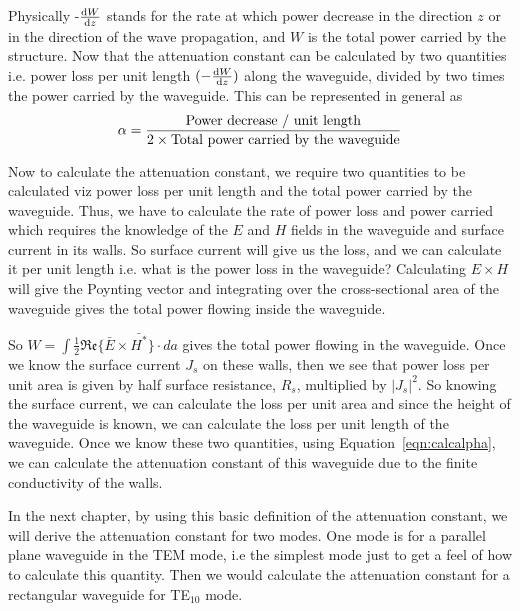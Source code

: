 Physically -$\dv{W}{z}$ stands for the rate at which power decrease in the direction $z$ or in the direction of the wave propagation, and $W$ is the total power carried by the structure. Now that the attenuation constant can be calculated by two quantities i.e. power loss per unit length $(-\dv{W}{z})$  along the waveguide, divided by two times the power carried by the waveguide. This can be represented in general as
\begin{dmath}
\alpha = \frac{\textnormal{Power decrease / unit length}}{2\times \textnormal{Total power carried by the waveguide}}
\end{dmath}

Now to calculate the attenuation constant, we require two quantities to be calculated viz power loss per unit length and the total power carried by the waveguide. Thus, we have to calculate the rate of power loss and power carried which requires the knowledge of the $E$ and $H$ fields in the waveguide and surface current in its walls. So surface current will give us the loss, and we can calculate it per unit length i.e. what is the power loss in the waveguide? Calculating $E\times H$ will give the Poynting vector and integrating over the cross-sectional area of the waveguide gives the total power flowing inside the waveguide. 

So $W = \int\frac{1}{2}\mathfrak{Re}\{\bar{E}\times\bar{H^*}\}\cdot{da}$ gives the total power flowing in  the waveguide. Once we know the surface current $J_{s}$ on these walls, then we see that power loss per unit area is given by half surface resistance, $R_s$, multiplied by $|J_{s}|^{2}$. So knowing the surface current, we can calculate the loss per unit area and since the height of the waveguide is known, we can calculate the loss per unit length of the waveguide. Once we know these two quantities, using Equation~\eqref{eqn:calcalpha}, we can calculate the attenuation constant of this waveguide due to the finite conductivity of the walls.

In the next chapter, by using this basic definition of the attenuation constant, we will derive the attenuation constant for two modes. One mode is for a parallel plane waveguide in the TEM mode, i.e the simplest mode just to get a feel of how to calculate this quantity. Then we would calculate the attenuation constant for a rectangular waveguide for TE$_{10}$ mode.

